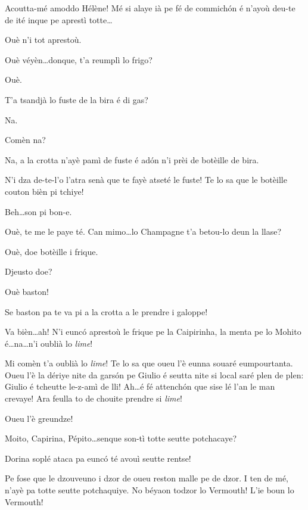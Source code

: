 \begin{drama}
\Bertaspeaks Acoutta-mé amoddo Hélène! Mé si alaye ià pe fé de commich\'on é n'ayoù deu-te de ité inque pe aprestì totte\ldots

\Helenespeaks Ouè n'i tot aprestoù.

\Bertaspeaks Ouè véyèn\ldots donque, t'a reumplì lo frigo?

\Helenespeaks Ouè.

\Bertaspeaks T'a tsandjà lo fuste de la bira é di gas?

\Helenespeaks Na. 

\Bertaspeaks Comèn na?

\Helenespeaks Na, a la crotta n'ayè pamì de fuste é ad\'on n'i prèi de botèille de bira.

\Bertaspeaks N'i dza de-te-l'o l'atra senà que te fayè atseté le fuste! Te lo sa que le botèille couton bièn pi tchiye!

\Helenespeaks{} Beh\ldots son pi bon-e.

\Bertaspeaks Ouè, te me le paye té. Can mimo\ldots lo Champagne t'a betou-lo deun la llase? 

\Helenespeaks{} Ouè, doe botèille i frique.

\Bertaspeaks Djeusto doe?

\Helenespeaks Ouè baston!

\Bertaspeaks Se baston pa te va pi a la crotta a le prendre i galoppe!

\Helenespeaks Va bièn\ldots ah! N'i eunc\'o aprestoù le frique pe la Caipirinha, la menta pe lo Mohito é\ldots na\ldots n'i oublià lo \textit{lime}!

\Bertaspeaks{} Mi comèn t'a oublià lo \textit{lime}! Te lo sa que oueu l'è eunna souaré eumpourtanta. Oueu l'è la dériye nite da gars\'on pe Giulio é seutta nite si local saré plen de plen: Giulio é tcheutte le-z-amì de lli! Ah\ldots é fé attench\'on que sise lé l'an le man crevaye! Ara feulla to de chouite prendre si \textit{lime}!


\Dorinaspeaks{} Oueu l'è greundze!

\Dorinaspeaks{} Moito, Capirina, Pépito\ldots senque son-tì totte seutte potchacaye?

\Bertaspeaks Dorina soplé ataca pa eunc\'o té avouì seutte rentse!

\Dorinaspeaks Pe fose que le dzouveuno i dzor de oueu reston malle pe de dzor. I ten de mé, n'ayè pa totte seutte potchaquiye. No béyaon todzor lo Vermouth! L'ie boun lo Vermouth!


\end{drama}
